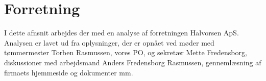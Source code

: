 \section{Forretning} \label{forretning}

I dette afnsnit arbejdes der med en analyse af forretningen Halvorsen ApS.
Analysen er lavet ud fra oplysninger, der er opnået ved møder med tømmermester Torben Rasmussen, vores PO, og sekretær Mette Fredensborg, diskussioner med arbejdsmand Anders Fredensborg Rasmussen, gennemlæsning af firmaets hjemmeside og dokumenter mm.





